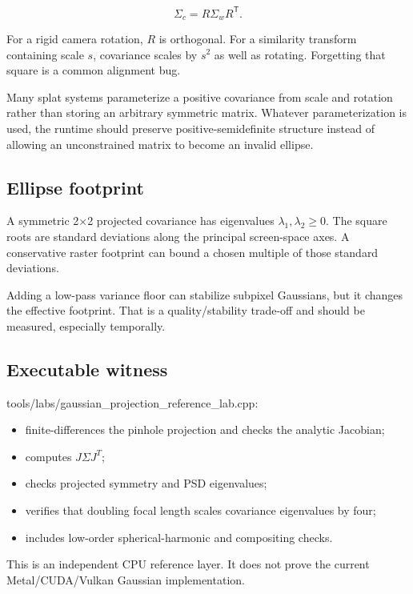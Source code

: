 \[
\Sigma_c=R\Sigma_wR^{\mathsf T}.
\]

For a rigid camera rotation, \(R\) is orthogonal. For a similarity transform containing scale \(s\), covariance scales by \(s^2\) as well as rotating. Forgetting that square is a common alignment bug.

Many splat systems parameterize a positive covariance from scale and rotation rather than storing an arbitrary symmetric matrix. Whatever parameterization is used, the runtime should preserve positive-semidefinite structure instead of allowing an unconstrained matrix to become an invalid ellipse.

\subsection{Ellipse footprint}\label{ellipse-footprint}

A symmetric 2×2 projected covariance has eigenvalues \(\lambda_1,\lambda_2\ge0\). The square roots are standard deviations along the principal screen-space axes. A conservative raster footprint can bound a chosen multiple of those standard deviations.

Adding a low-pass variance floor can stabilize subpixel Gaussians, but it changes the effective footprint. That is a quality/stability trade-off and should be measured, especially temporally.

\subsection{Executable witness}\label{executable-witness}

tools/labs/gaussian\_projection\_reference\_lab.cpp:

\begin{itemize}
\tightlist
\item
  finite-differences the pinhole projection and checks the analytic Jacobian;
\item
  computes \(J\Sigma J^T\);
\item
  checks projected symmetry and PSD eigenvalues;
\item
  verifies that doubling focal length scales covariance eigenvalues by four;
\item
  includes low-order spherical-harmonic and compositing checks.
\end{itemize}

This is an independent CPU reference layer. It does not prove the current Metal/CUDA/Vulkan Gaussian implementation.

